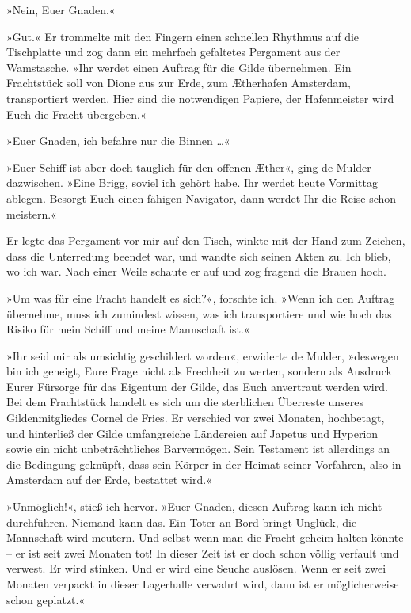 »Nein, Euer Gnaden.«

»Gut.« Er trommelte mit den Fingern einen schnellen Rhythmus auf
die Tischplatte und zog dann ein mehrfach gefaltetes Pergament aus
der Wamstasche. »Ihr werdet einen Auftrag für die Gilde übernehmen.
Ein Frachtstück soll von Dione aus zur Erde, zum Ætherhafen
Amsterdam, transportiert werden. Hier sind die notwendigen Papiere,
der Hafenmeister wird Euch die Fracht übergeben.«

»Euer Gnaden, ich befahre nur die Binnen \ldots{}«

»Euer Schiff ist aber doch tauglich für den offenen Æther«, ging de
Mulder dazwischen. »Eine Brigg, soviel ich gehört habe. Ihr werdet
heute Vormittag ablegen. Besorgt Euch einen fähigen Navigator, dann
werdet Ihr die Reise schon meistern.«

Er legte das Pergament vor mir auf den Tisch, winkte mit der Hand
zum Zeichen, dass die Unterredung beendet war, und wandte sich
seinen Akten zu. Ich blieb, wo ich war. Nach einer Weile schaute er
auf und zog fragend die Brauen hoch.

»Um was für eine Fracht handelt es sich?«, forschte ich. »Wenn ich
den Auftrag übernehme, muss ich zumindest wissen, was ich
transportiere und wie hoch das Risiko für mein Schiff und meine
Mannschaft ist.«

»Ihr seid mir als umsichtig geschildert worden«, erwiderte de
Mulder, »deswegen bin ich geneigt, Eure Frage nicht als Frechheit
zu werten, sondern als Ausdruck Eurer Fürsorge für das Eigentum der
Gilde, das Euch anvertraut werden wird. Bei dem Frachtstück handelt
es sich um die sterblichen Überreste unseres Gildenmitgliedes
Cornel de Fries. Er verschied vor zwei Monaten, hochbetagt, und
hinterließ der Gilde umfangreiche Ländereien auf Japetus und
Hyperion sowie ein nicht unbeträchtliches Barvermögen. Sein
Testament ist allerdings an die Bedingung geknüpft, dass sein
Körper in der Heimat seiner Vorfahren, also in Amsterdam auf der
Erde, bestattet wird.«

»Unmöglich!«, stieß ich hervor. »Euer Gnaden, diesen Auftrag kann
ich nicht durchführen. Niemand kann das. Ein Toter an Bord bringt
Unglück, die Mannschaft wird meutern. Und selbst wenn man die
Fracht geheim halten könnte – er ist seit zwei Monaten tot! In
dieser Zeit ist er doch schon völlig verfault und verwest. Er wird
stinken. Und er wird eine Seuche auslösen. Wenn er seit zwei
Monaten verpackt in dieser Lagerhalle verwahrt wird, dann ist er
möglicherweise schon geplatzt.«

